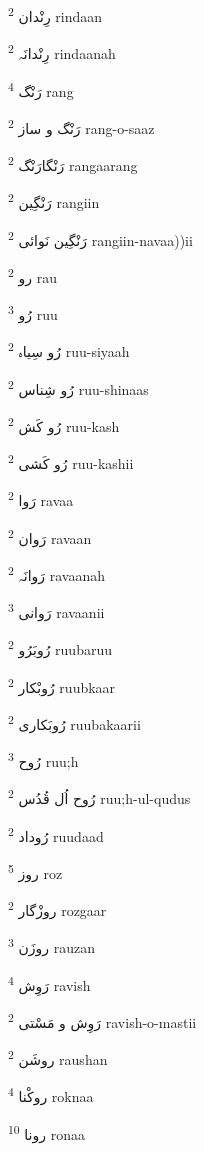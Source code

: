 \documentclass[12pt]{article}
\begin{document}
\begin{multicols}{5}
{\ur رِنْدان}   \textsuperscript{2} rindaan

{\ur رِنْدانَہ}   \textsuperscript{2} rindaanah

{\ur رَنْگ}   \textsuperscript{4} rang

{\ur رَنْگ و ساز}   \textsuperscript{2} rang-o-saaz

{\ur رَنْگارَنْگ}   \textsuperscript{2} rangaarang

{\ur رَنْگِین}   \textsuperscript{2} rangiin

{\ur رَنْگِین نَوائی}   \textsuperscript{2} rangiin-navaa))ii

{\ur رو}   \textsuperscript{2} rau

{\ur رُو}   \textsuperscript{3} ruu

{\ur رُو سِیاہ}   \textsuperscript{2} ruu-siyaah

{\ur رُو شِناس}   \textsuperscript{2} ruu-shinaas

{\ur رُو کَش}   \textsuperscript{2} ruu-kash

{\ur رُو کَشی}   \textsuperscript{2} ruu-kashii

{\ur رَوا}   \textsuperscript{2} ravaa

{\ur رَوان}   \textsuperscript{2} ravaan

{\ur رَوانَہ}   \textsuperscript{2} ravaanah

{\ur رَوانی}   \textsuperscript{3} ravaanii

{\ur رُوبَرُو}   \textsuperscript{2} ruubaruu

{\ur رُوبْکار}   \textsuperscript{2} ruubkaar

{\ur رُوبَکاری}   \textsuperscript{2} ruubakaarii

{\ur رُوح}   \textsuperscript{3} ruu;h

{\ur رُوح اُل قُدُس}   \textsuperscript{2} ruu;h-ul-qudus

{\ur رُوداد}   \textsuperscript{2} ruudaad

{\ur روز}   \textsuperscript{5} roz

{\ur روزْگار}   \textsuperscript{2} rozgaar

{\ur روزَن}   \textsuperscript{3} rauzan

{\ur رَوِش}   \textsuperscript{4} ravish

{\ur رَوِش و مَسْتی}   \textsuperscript{2} ravish-o-mastii

{\ur روشَن}   \textsuperscript{2} raushan

{\ur روکْنا}   \textsuperscript{4} roknaa

{\ur رونا}   \textsuperscript{10} ronaa


\end{multicols}
\end{document}
